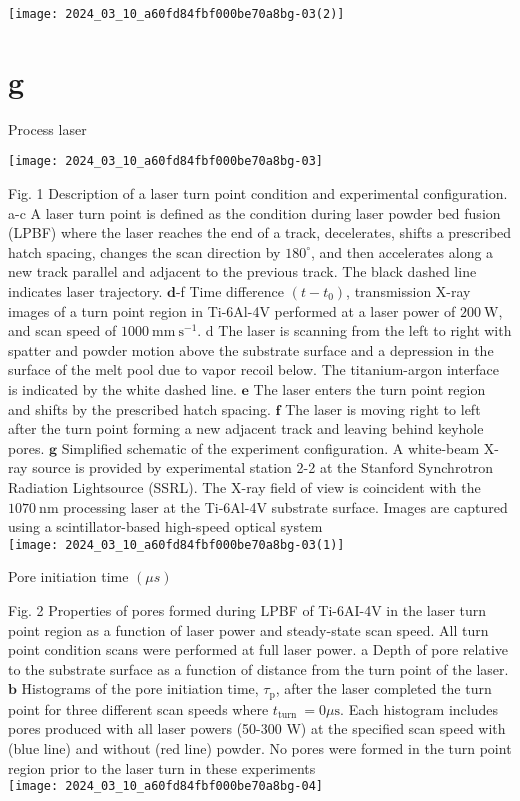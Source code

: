 \documentclass[10pt]{article}
\begin{document}
\begin{center}
\texttt{[image: 2024\_03\_10\_a60fd84fbf000be70a8bg-03(2)]}
\end{center}

\section*{g}
Process laser

\begin{center}
\texttt{[image: 2024\_03\_10\_a60fd84fbf000be70a8bg-03]}
\end{center}

Fig. 1 Description of a laser turn point condition and experimental configuration. a-c A laser turn point is defined as the condition during laser powder bed fusion (LPBF) where the laser reaches the end of a track, decelerates, shifts a prescribed hatch spacing, changes the scan direction by $180^{\circ}$, and then accelerates along a new track parallel and adjacent to the previous track. The black dashed line indicates laser trajectory. $\mathbf{d}$-f Time difference $\left(t-t_{0}\right)$, transmission X-ray images of a turn point region in Ti-6Al-4V performed at a laser power of $200 \mathrm{~W}$, and scan speed of $1000 \mathrm{~mm} \mathrm{~s}^{-1}$. d The laser is scanning from the left to right with spatter and powder motion above the substrate surface and a depression in the surface of the melt pool due to vapor recoil below. The titanium-argon interface is indicated by the white dashed line. $\mathbf{e}$ The laser enters the turn point region and shifts by the prescribed hatch spacing. $\mathbf{f}$ The laser is moving right to left after the turn point forming a new adjacent track and leaving behind keyhole pores. $\mathbf{g}$ Simplified schematic of the experiment configuration. A white-beam X-ray source is provided by experimental station 2-2 at the Stanford Synchrotron Radiation Lightsource (SSRL). The X-ray field of view is coincident with the $1070 \mathrm{~nm}$ processing laser at the Ti-6Al-4V substrate surface. Images are captured using a scintillator-based high-speed optical system\\
\texttt{[image: 2024\_03\_10\_a60fd84fbf000be70a8bg-03(1)]}

Pore initiation time $(\mu s)$

Fig. 2 Properties of pores formed during LPBF of Ti-6AI-4V in the laser turn point region as a function of laser power and steady-state scan speed. All turn point condition scans were performed at full laser power. a Depth of pore relative to the substrate surface as a function of distance from the turn point of the laser. $\mathbf{b}$ Histograms of the pore initiation time, $\tau_{\mathrm{p}}$, after the laser completed the turn point for three different scan speeds where $t_{\text {turn }}=0 \mu \mathrm{s}$. Each histogram includes pores produced with all laser powers (50-300 W) at the specified scan speed with (blue line) and without (red line) powder. No pores were formed in the turn point region prior to the laser turn in these experiments\\
\texttt{[image: 2024\_03\_10\_a60fd84fbf000be70a8bg-04]}
\end{document}
